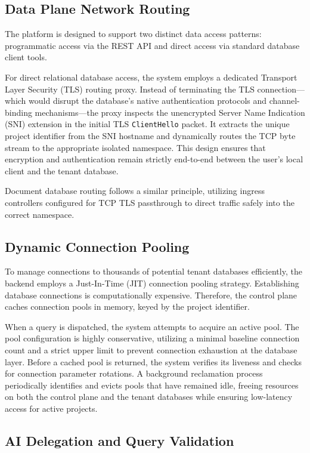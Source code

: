 \subsection{Data Plane Network Routing}

The platform is designed to support two distinct data access patterns: programmatic access via the REST API and direct access via standard database client tools. 

For direct relational database access, the system employs a dedicated Transport Layer Security (TLS) routing proxy. Instead of terminating the TLS connection—which would disrupt the database's native authentication protocols and channel-binding mechanisms—the proxy inspects the unencrypted Server Name Indication (SNI) extension in the initial TLS \texttt{ClientHello} packet. It extracts the unique project identifier from the SNI hostname and dynamically routes the TCP byte stream to the appropriate isolated namespace. This design ensures that encryption and authentication remain strictly end-to-end between the user's local client and the tenant database.

Document database routing follows a similar principle, utilizing ingress controllers configured for TCP TLS passthrough to direct traffic safely into the correct namespace.

\subsection{Dynamic Connection Pooling}

To manage connections to thousands of potential tenant databases efficiently, the backend employs a Just-In-Time (JIT) connection pooling strategy. Establishing database connections is computationally expensive. Therefore, the control plane caches connection pools in memory, keyed by the project identifier.

When a query is dispatched, the system attempts to acquire an active pool. The pool configuration is highly conservative, utilizing a minimal baseline connection count and a strict upper limit to prevent connection exhaustion at the database layer. Before a cached pool is returned, the system verifies its liveness and checks for connection parameter rotations. A background reclamation process periodically identifies and evicts pools that have remained idle, freeing resources on both the control plane and the tenant databases while ensuring low-latency access for active projects.

\subsection{AI Delegation and Query Validation}

